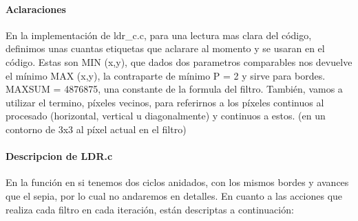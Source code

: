 \documentclass[a4paper]{article}
\begin{document}
 \paragraph{\textbf{Aclaraciones}}
\hfill \break   
        En la implementación de ldr_c.c, para una lectura mas clara del código, definimos unas cuantas etiquetas que aclarare al momento y se usaran en el código. Estas son
        \hfill \break   
        MIN (x,y),  que dados dos parametros comparables nos devuelve el mínimo
        \hfill \break   
        MAX (x,y), la contraparte de mínimo
        \hfill \break   
        P =  2 y sirve para bordes.
        \hfill \break   
        MAXSUM = 4876875, una constante de la formula del filtro.
        \hfill \break   
        También, vamos a utilizar el termino, píxeles vecinos, para referirnos a los píxeles continuos al procesado (horizontal, vertical u diagonalmente) y  continuos a estos. (en un contorno de 3x3 al píxel actual en el filtro)   
        \hfill \break   
\paragraph{\textbf{Descripcion de LDR.c}}
\hfill \break    
         En la función en si tenemos dos ciclos anidados, con los mismos bordes y avances que el sepia, por lo cual no andaremos en detalles. 
        En cuanto a las acciones que realiza cada filtro en cada iteración, están descriptas a continuación:
        \hfill \break   
        
\end{document}

